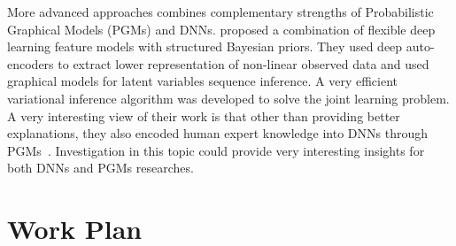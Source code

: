 \message{ !name(usyd_phd_proposal.tex)}\documentclass{article} \usepackage{tabularx}
\renewcommand{\citename}{\citet} \renewcommand{\cite}{\citep}
\begin{document}
More advanced approaches combines complementary strengths of
Probabilistic Graphical Models (PGMs) and DNNs.
\citename{johnson2016composing} proposed a combination of
flexible deep learning feature models with structured Bayesian
priors. They used deep auto-encoders to extract lower
representation of non-linear observed data and used graphical
models for latent variables sequence inference. A very efficient
variational inference algorithm was developed to solve the joint
learning problem. A very interesting view of their work is that
other than providing better explanations, they also encoded human
expert knowledge into DNNs through
PGMs~\cite{johnson2016composing}. Investigation in this topic
could provide very interesting insights for both DNNs and PGMs
researches.

\section{Work Plan}
\end{document}
